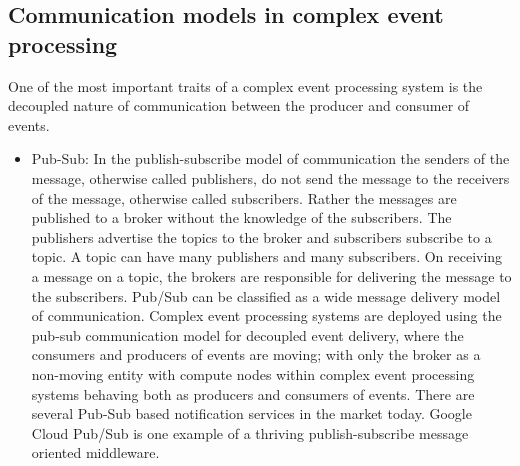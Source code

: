 \subsection{Communication models in complex event processing}
One of the most important traits of a complex event processing system is the decoupled nature of communication between the producer and consumer of events. 
\begin{itemize}
	\item Pub-Sub: In the publish-subscribe model of communication the senders of the message, otherwise called publishers, do not send the message to the receivers of the message, otherwise called subscribers. Rather the messages are published to a broker without the knowledge of the subscribers. The publishers advertise the topics to the broker and subscribers subscribe to a topic. A topic can have many publishers and many subscribers. On receiving a message on a topic, the brokers are responsible for delivering the message to the subscribers. Pub/Sub can be classified as a wide message delivery model of communication. Complex event processing systems are deployed using the pub-sub communication model for decoupled event delivery, where the consumers and producers of events are moving; with only the broker as a non-moving entity with compute nodes within complex event processing systems behaving both as producers and consumers of events. There are several Pub-Sub based notification services in the market today. Google Cloud Pub/Sub \cite{Krishnan2015} is one example of a thriving publish-subscribe message oriented middleware.
	

\end{itemize}
